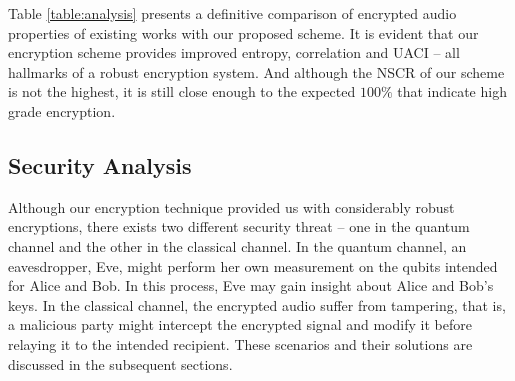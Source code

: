\documentclass[a4paper]{cas-sc}
\begin{document}
Table \ref{table:analysis} presents a definitive comparison of encrypted audio properties of existing works with our proposed scheme. It is evident that our encryption scheme provides improved entropy, correlation and UACI -- all hallmarks of a robust encryption system. And although the NSCR of our scheme is not the highest, it is still close enough to the expected $100\%$ that indicate high grade encryption.
\subsection{Security Analysis}
Although our encryption technique provided us with considerably robust encryptions, there exists two different security threat -- one in the quantum channel and the other in the classical channel. In the quantum channel, an eavesdropper, Eve, might perform her own measurement on the qubits intended for Alice and Bob. In this process, Eve may gain insight about Alice and Bob's keys. In the classical channel, the encrypted audio suffer from tampering, that is, a malicious party might intercept the encrypted signal and modify it before relaying it to the intended recipient. These scenarios and their solutions are discussed in the subsequent sections.
\end{document}
